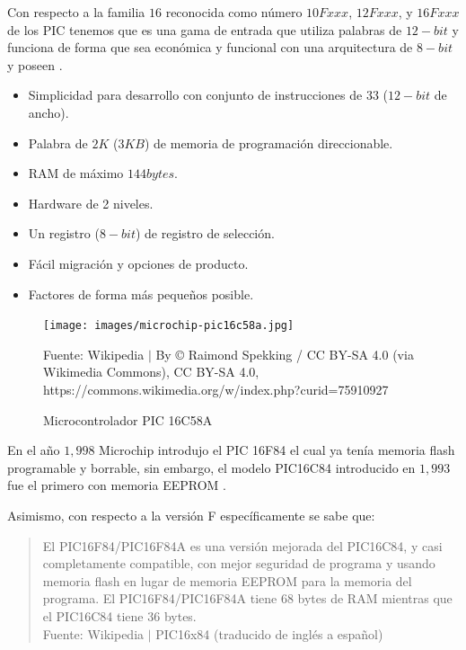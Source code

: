 \documentclass[conference]{IEEEtran}
\begin{document}
    Con respecto a la familia $16$ reconocida como número $10Fxxx$, $12Fxxx$, y $16Fxxx$ de los PIC tenemos que es una gama de entrada que utiliza palabras de $12-bit$ y funciona de forma que sea económica y funcional con una arquitectura de $8-bit$ y poseen \cite{microchip-developer-help-2022}.

    \bigbreak

    \begin{itemize}
        \item Simplicidad para desarrollo con conjunto de instrucciones de $33$ ($12-bit$ de ancho).
        \item Palabra de $2K$ ($3KB$) de memoria de programación direccionable.
        \item RAM de máximo $144bytes$.
        \item Hardware de 2 niveles.
        \item Un registro ($8-bit$) de registro de selección.
        \item Fácil migración y opciones de producto.
        \item Factores de forma más pequeños posible.
    \end{itemize}

    \bigbreak

    \begin{figure}[H]
        \centering
        \texttt{[image: images/microchip-pic16c58a.jpg]}
        \caption{Microcontrolador PIC 16C58A} \footnotesize
        Fuente: Wikipedia $\mid$ By © Raimond Spekking / CC BY-SA 4.0 (via Wikimedia Commons), CC BY-SA 4.0, https://commons.wikimedia.org/w/index.php?curid=75910927 \cite{wikipedia-pic-2022}
    \end{figure}

    \bigbreak

    En el año $1,998$ Microchip introdujo el PIC 16F84 el cual ya tenía memoria flash programable y borrable, sin embargo, el modelo PIC16C84 introducido en $1,993$ fue el primero con memoria EEPROM \cite{wikipedia-pic-2022}.

    \bigbreak

    Asimismo, con respecto a la versión F específicamente se sabe que:

    \bigbreak

    \begin{quote}
        El PIC16F84/PIC16F84A es una versión mejorada del PIC16C84, y casi completamente compatible, con mejor seguridad de programa y usando memoria flash en lugar de memoria EEPROM para la memoria del programa. El PIC16F84/PIC16F84A tiene 68 bytes de RAM mientras que el PIC16C84 tiene 36 bytes.\\
        \small Fuente: Wikipedia $\mid$ PIC16x84 (traducido de inglés a español) \cite{wikipedia-pc16x84-2020}
    \end{quote}
\end{document}
